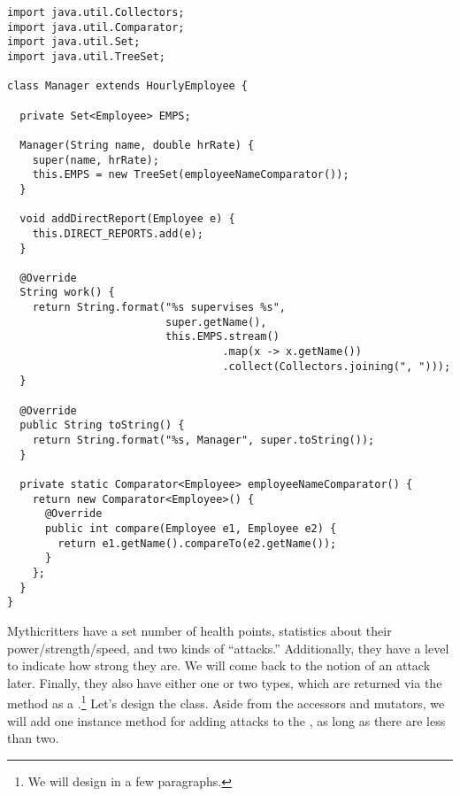 \enlargethispage{2\baselineskip}
\begin{lstlisting}[language=MyJava]
import java.util.Collectors;
import java.util.Comparator;
import java.util.Set;
import java.util.TreeSet;

class Manager extends HourlyEmployee {

  private Set<Employee> EMPS;

  Manager(String name, double hrRate) {
    super(name, hrRate);
    this.EMPS = new TreeSet(employeeNameComparator());
  }

  void addDirectReport(Employee e) {
    this.DIRECT_REPORTS.add(e);
  }

  @Override
  String work() {
    return String.format("%s supervises %s", 
                         super.getName(),
                         this.EMPS.stream()
                                  .map(x -> x.getName())
                                  .collect(Collectors.joining(", ")));
  }

  @Override
  public String toString() {
    return String.format("%s, Manager", super.toString());
  }

  private static Comparator<Employee> employeeNameComparator() {
    return new Comparator<Employee>() {
      @Override
      public int compare(Employee e1, Employee e2) {
        return e1.getName().compareTo(e2.getName());
      }
    };
  }
}
\end{lstlisting}


Mythicritters have a set number of health points, statistics about their power/strength/speed, and two kinds of ``attacks.'' 
Additionally, they have a level to indicate how strong they are. 
We will come back to the notion of an attack later. 
Finally, they also have either one or two types, which are returned via the  method as a .\footnote{We will design  in a few paragraphs.} 
Let's design the  class. Aside from the accessors and mutators, we will add one instance method for adding attacks to the , as long as there are less than two. 

